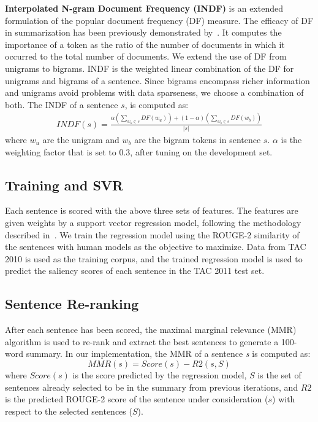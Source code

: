 \noindent\textbf{Interpolated N-gram Document Frequency (INDF) } is an extended formulation of the popular document frequency (DF) measure. The efficacy of DF in summarization has been previously demonstrated by~\cite{ICON_2009,Schilder-Kondadadi-08}. It computes the importance of a token as the ratio of the number of documents in which it occurred to the total number of documents. We extend the use of DF from unigrams to bigrams. INDF is the weighted linear combination of the DF for unigrams and bigrams of a sentence. Since bigrams encompass richer information and unigrams avoid problems with data sparseness, we choose a combination of both. The INDF of a sentence $s$, is computed as:
\begin{eqnarray*}
INDF(s) = \frac{\alpha(\sum_{w_{u} \in s} DF(w_{u})) + (1-\alpha) (\sum_{w_{b} \in s} DF(w_{b}))}{|s|} 
\end{eqnarray*}
where $w_{u}$ are the unigram and $w_b$ are the bigram tokens in sentence $s$. $\alpha$ is the weighting factor that is set to 0.3, after tuning on the development set. 

\subsection{Training and SVR}
Each sentence is scored with the above three sets of features. The features are given weights by a support vector regression model, following the methodology described in~\cite{ICON_2009}. We train the regression model using the ROUGE-2 similarity of the sentences with human models as the objective to maximize. Data from TAC 2010 is used as the training corpus, and the trained regression model is used to predict the saliency scores of each sentence in the TAC 2011 test set. 

\subsection{Sentence Re-ranking}
After each sentence has been scored, the maximal marginal relevance (MMR)~\cite{carbonell1998use} algorithm is used to re-rank and extract the best sentences to generate a 100-word summary. In our implementation, the MMR of a sentence \textit{s} is computed as:
\begin{equation*}
MMR(s) = Score(s) - R2(s, S)
\label{eqn:mmr1}
\end{equation*}
where $Score(s)$ is the score predicted by the regression model, $S$ is the set of sentences already selected to be in the summary from previous iterations, and $R2$ is the predicted ROUGE-2 score of the sentence under consideration ($s$) with respect to the selected sentences ($S$).

